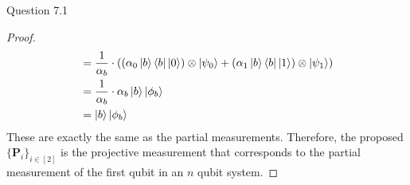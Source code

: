 \begin{solution}{Question 7.1}
\begin{proof}
\begin{equation}
\begin{split}
                              &= \frac{1}{\alpha_b}\cdot\left(\left(\alpha_0\ket{b}\bra{b}\ket{0}\right)\otimes\ket{\psi_0} + \left(\alpha_1\ket{b}\bra{b}\ket{1}\right)\otimes\ket{\psi_1}\right)\\
                              &= \frac{1}{\alpha_b}\cdot\alpha_b\ket{b}\ket{\phi_b}\\
                              &= \ket{b}\ket{\phi_b}
            \end{split}
        \end{equation}
        These are exactly the same as the partial measurements. Therefore, the proposed $\{\mathbf{P}_i\}_{i\in [2]}$ is the projective measurement that corresponds to the partial measurement of the first qubit in an $n$ qubit system.
    \end{proof}
\end{solution}
